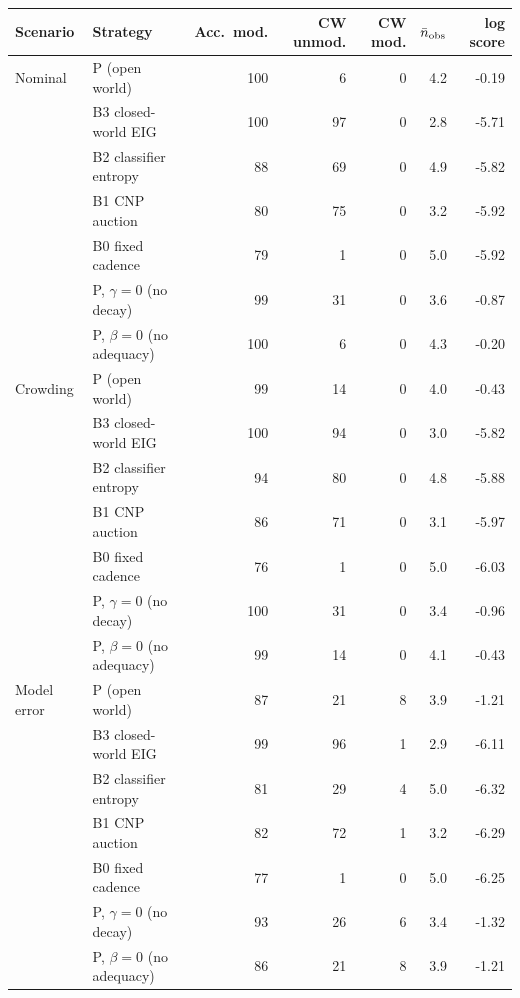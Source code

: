 \begin{tabular}{llrrrrr}
\toprule
Scenario & Strategy & Acc.\ mod. & CW unmod. & CW mod. & $\bar n_{\rm obs}$ & log score \\
\midrule
Nominal & P (open world) & 100 & 6 & 0 & 4.2 & -0.19 \\
 & B3 closed-world EIG & 100 & 97 & 0 & 2.8 & -5.71 \\
 & B2 classifier entropy & 88 & 69 & 0 & 4.9 & -5.82 \\
 & B1 CNP auction & 80 & 75 & 0 & 3.2 & -5.92 \\
 & B0 fixed cadence & 79 & 1 & 0 & 5.0 & -5.92 \\
 & P, $\gamma=0$ (no decay) & 99 & 31 & 0 & 3.6 & -0.87 \\
 & P, $\beta=0$ (no adequacy) & 100 & 6 & 0 & 4.3 & -0.20 \\
\midrule
Crowding & P (open world) & 99 & 14 & 0 & 4.0 & -0.43 \\
 & B3 closed-world EIG & 100 & 94 & 0 & 3.0 & -5.82 \\
 & B2 classifier entropy & 94 & 80 & 0 & 4.8 & -5.88 \\
 & B1 CNP auction & 86 & 71 & 0 & 3.1 & -5.97 \\
 & B0 fixed cadence & 76 & 1 & 0 & 5.0 & -6.03 \\
 & P, $\gamma=0$ (no decay) & 100 & 31 & 0 & 3.4 & -0.96 \\
 & P, $\beta=0$ (no adequacy) & 99 & 14 & 0 & 4.1 & -0.43 \\
\midrule
Model error & P (open world) & 87 & 21 & 8 & 3.9 & -1.21 \\
 & B3 closed-world EIG & 99 & 96 & 1 & 2.9 & -6.11 \\
 & B2 classifier entropy & 81 & 29 & 4 & 5.0 & -6.32 \\
 & B1 CNP auction & 82 & 72 & 1 & 3.2 & -6.29 \\
 & B0 fixed cadence & 77 & 1 & 0 & 5.0 & -6.25 \\
 & P, $\gamma=0$ (no decay) & 93 & 26 & 6 & 3.4 & -1.32 \\
 & P, $\beta=0$ (no adequacy) & 86 & 21 & 8 & 3.9 & -1.21 \\
\bottomrule
\end{tabular}
